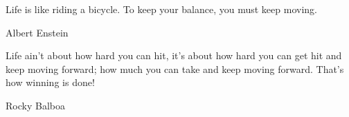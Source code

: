 Life is like riding a bicycle. To keep your balance, you must keep moving.

\bigskip

\hfill Albert Enstein

\bigskip

Life ain't about how hard you can hit, it's about how hard you can get hit and keep moving forward; how much you can take and keep moving forward. That's how winning is done!

\bigskip

\hfill Rocky Balboa